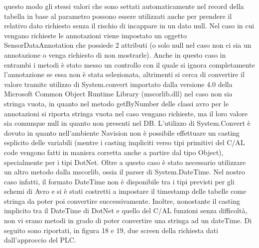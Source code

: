 questo modo gli stessi valori che sono settati automaticamente nel record della tabella in base al parametro possono essere utilizzati anche per prendere il relativo dato richiesto senza il rischio di incappare in un dato null. Nel caso in cui vengano richieste le annotazioni viene impostato un oggetto SensorDataAnnotation che possiede 2 attributi (o solo null nel caso non ci sia un annotazione o venga richiesto di non mostrarle). Anche in questo caso in entrambi i metodi è stato messo un controllo con il quale si ignora completamente l’annotazione se essa non è stata selezionata, altrimenti si cerca di convertire il valore tramite utilizzo di System.convert importato dalla versione 4.0 della Microsoft Common Object Runtime Library (mscorlib.dll) nel caso non sia stringa vuota, in quanto nel metodo getByNumber delle classi avro per le annotazioni si riporta stringa vuota nel caso vengano richieste, ma il loro valore sia comunque null in quanto non presenti nel DB. L’utilizzo di System.Convert è dovuto in quanto nell’ambiente Navision non è possibile effettuare un casting esplicito delle variabili (mentre i casting impliciti verso tipi primitivi del C/AL code vengono fatti in maniera corretta anche a partire dal tipo Object), specialmente per i tipi DotNet. Oltre a questo caso è stato necessario utilizzare un altro metodo dalla mscorlib, ossia il parser di System.DateTime. Nel nostro caso infatti, il formato DateTime non è disponibile tra i tipi previsti per gli schemi di Avro e si è stati costretti a impostare il timestamp delle tabelle come stringa da poter poi convertire successivamente. Inoltre, nonostante il casting implicito tra il DateTime di DotNet e quello del C/AL funzioni senza difficoltà, non vi erano metodi in grado di poter convertire una stringa ad un dateTime. Di seguito sono riportati, in figura 18 e 19, due screen della richiesta dati dall'approccio del PLC.

